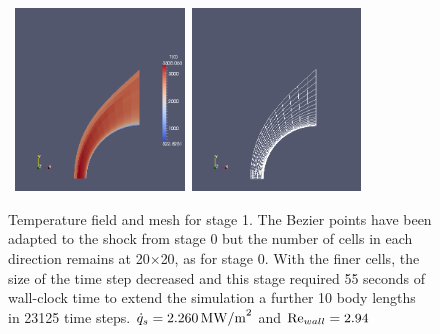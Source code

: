 \begin{figure}[htbp]
\begin{center}
\mbox{
\includegraphics[width=0.4\textwidth]{../2D/sphere-heat-transfer/sphere1-T-field.png}
\includegraphics[width=0.4\textwidth]{../2D/sphere-heat-transfer/sphere1-mesh.png}
}
\end{center}
\caption{Temperature field and mesh for stage 1.
  The Bezier points have been adapted to the shock from stage 0 but the number of cells
  in each direction remains at 20$\times$20, as for stage 0.
  With the finer cells, the size of the time step decreased and this stage required 55 seconds of wall-clock time
  to extend the simulation a further 10 body lengths in 23125 time steps.
  $\dot{q}_s=2.260\,{\rm MW/m}^2$ and ${\rm Re}_{wall} =2.94$}
\label{sphere-heat-transfer-stage-1-fig}
\end{figure}

